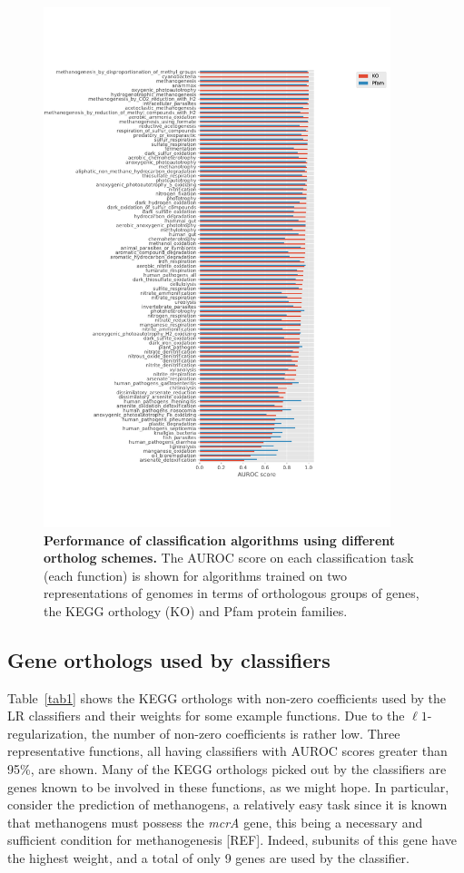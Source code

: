 \documentclass[10pt,letterpaper]{article}
\begin{document}
\begin{figure}[!h]
\includegraphics[width=0.9\textwidth]{orth_compare}
\caption{{\bf Performance of classification algorithms using different ortholog schemes.}
The AUROC score on each classification task (each function) is shown for algorithms trained on two representations of genomes in terms of orthologous groups of genes, the KEGG orthology (KO) and Pfam protein families.}
\label{fig1}
\end{figure}


\subsection*{Gene orthologs used by classifiers}
Table~\ref{tab1} shows the KEGG orthologs with non-zero coefficients used by the LR classifiers and their weights for some example functions. Due to the $\ell1$-regularization, the number of non-zero coefficients is rather low. Three representative functions, all having classifiers with AUROC scores greater than 95\%, are shown. Many of the KEGG orthologs picked out by the classifiers are genes known to be involved in these functions, as we might hope. In particular, consider the prediction of methanogens, a relatively easy task since it is known that methanogens must possess the \emph{mcrA} gene, this being a necessary and sufficient condition for methanogenesis [REF]. Indeed, subunits of this gene have the highest weight, and a total of only 9 genes are used by the classifier. 
\end{document}
